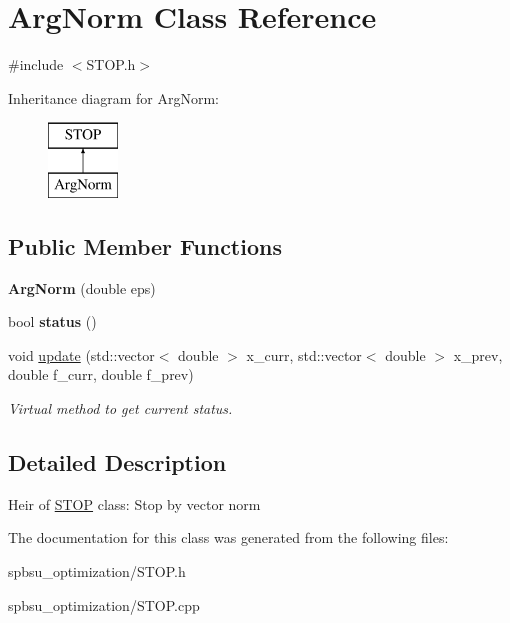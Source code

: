 \hypertarget{class_arg_norm}{}\section{Arg\+Norm Class Reference}
\label{class_arg_norm}


{\ttfamily \#include $<$S\+T\+O\+P.\+h$>$}

Inheritance diagram for Arg\+Norm\+:\begin{figure}[H]
\begin{center}
\leavevmode
\includegraphics[height=2.000000cm]{class_arg_norm}
\end{center}
\end{figure}
\subsection*{Public Member Functions}
\begin{DoxyCompactItemize}
\item 
\mbox{\label{class_arg_norm_ab68ee8dd63445d291bdf9a46cd38aa96}} 
{\bfseries Arg\+Norm} (double eps)
\item 
\mbox{\label{class_arg_norm_a360087b606044023e4fc979ddc35cf06}} 
bool {\bfseries status} ()
\item 
\mbox{\label{class_arg_norm_aaaa7006840927462a193a6ed508133e3}} 
void \hyperlink{class_arg_norm_aaaa7006840927462a193a6ed508133e3}{update} (std\+::vector$<$ double $>$ x\+\_\+curr, std\+::vector$<$ double $>$ x\+\_\+prev, double f\+\_\+curr, double f\+\_\+prev)
\begin{DoxyCompactList}\small\item\em Virtual method to get current status. \end{DoxyCompactList}\end{DoxyCompactItemize}


\subsection{Detailed Description}
Heir of \hyperlink{class_s_t_o_p}{S\+T\+OP} class\+: Stop by vector norm 

The documentation for this class was generated from the following files\+:\begin{DoxyCompactItemize}
\item 
spbsu\+\_\+optimization/S\+T\+O\+P.\+h\item 
spbsu\+\_\+optimization/S\+T\+O\+P.\+cpp\end{DoxyCompactItemize}
